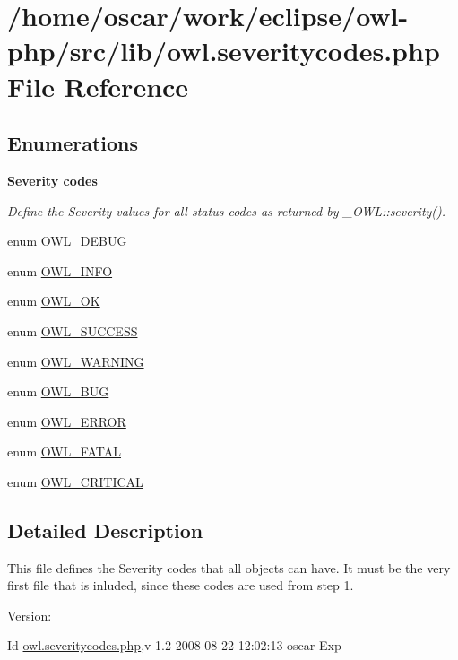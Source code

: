\hypertarget{owl_8severitycodes_8php}{
\section{/home/oscar/work/eclipse/owl-php/src/lib/owl.severitycodes.php File Reference}
\label{owl_8severitycodes_8php}
}
\subsection*{Enumerations}
\begin{Indent}{\bf Severity codes}\par
{\em Define the Severity values for all status codes as returned by \_\-OWL::severity(). }\begin{CompactItemize}
\item 
enum \hyperlink{owl_8severitycodes_8php_df6a439e74801dd83160f085e9af5546}{OWL\_\-DEBUG} 
\item 
enum \hyperlink{owl_8severitycodes_8php_139328861128689f2f4def6a399d9057}{OWL\_\-INFO} 
\item 
enum \hyperlink{owl_8severitycodes_8php_bc72c053cfd10025fe57797c41eab18e}{OWL\_\-OK} 
\item 
enum \hyperlink{owl_8severitycodes_8php_96223f06ba27bf5cbefa6e9d702897c2}{OWL\_\-SUCCESS} 
\item 
enum \hyperlink{owl_8severitycodes_8php_ce886152e2e86cd2e91cb833fd495adb}{OWL\_\-WARNING} 
\item 
enum \hyperlink{owl_8severitycodes_8php_97e9838587d4386a48d7e40020bf0a7f}{OWL\_\-BUG} 
\item 
enum \hyperlink{owl_8severitycodes_8php_b57d46c4dff0628f7f46aa11db9325c9}{OWL\_\-ERROR} 
\item 
enum \hyperlink{owl_8severitycodes_8php_4c27106ebf80027ef1ebf953ed172e76}{OWL\_\-FATAL} 
\item 
enum \hyperlink{owl_8severitycodes_8php_4628d2e3b0d08692a62a1b8cad05465b}{OWL\_\-CRITICAL} 
\end{CompactItemize}
\end{Indent}


\subsection{Detailed Description}
This file defines the Severity codes that all objects can have. It must be the very first file that is inluded, since these codes are used from step 1. \begin{Desc}
\item[Version:]\end{Desc}
\begin{Desc}
\item[Id]\hyperlink{owl_8severitycodes_8php}{owl.severitycodes.php},v 1.2 2008-08-22 12:02:13 oscar Exp \end{Desc}


